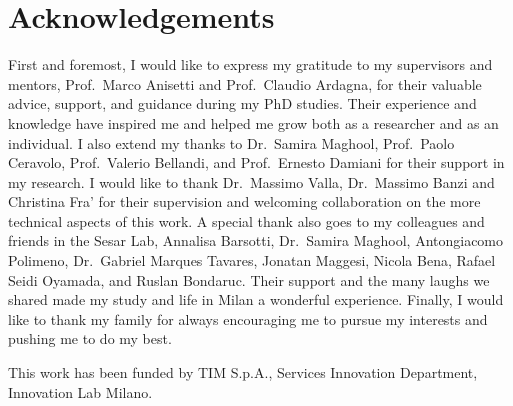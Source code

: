\chapter{Acknowledgements}
First and foremost, I would like to express my gratitude to my supervisors and mentors, Prof.\ Marco Anisetti and Prof.\ Claudio Ardagna, for their valuable advice, support, and guidance during my PhD studies. Their experience and knowledge have inspired me and helped me grow both as a researcher and as an individual.
I also extend my thanks to Dr.\ Samira Maghool, Prof.\ Paolo Ceravolo, Prof.\ Valerio Bellandi, and Prof.\ Ernesto Damiani for their support in my research.
I would like to thank Dr.\ Massimo Valla, Dr.\ Massimo Banzi and Christina Fra' for their supervision and welcoming collaboration on the more technical aspects of this work.
A special thank also goes to my colleagues and friends in the Sesar Lab, Annalisa Barsotti, Dr.\ Samira Maghool, Antongiacomo Polimeno, Dr.\ Gabriel Marques Tavares, Jonatan Maggesi, Nicola Bena, Rafael Seidi Oyamada, and Ruslan Bondaruc. Their support and the many laughs we shared made my study and life in Milan a wonderful experience.
Finally, I would like to thank my family for always encouraging me to pursue my interests and pushing me to do my best.

This work has been funded by TIM S.p.A., Services Innovation Department, Innovation Lab Milano.
